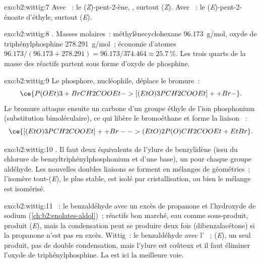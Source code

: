 \begin{solution}{exo:b2:wittig:7}
Avec ~: le (\textit{Z})-pent-2-ène, , surtout (\textit{Z}). Avec
~: le (\textit{E})-pent-2-énoate d'éthyle, surtout (\textit{E}).
\end{solution}

\begin{solution}{exo:b2:wittig:8}
. Masses molaires~: méthylènecyclohexane \qty{96.173}{g/mol},
oxyde de triphénylphosphine \qty{278.291}{g/mol}~; économie d'atomes $96.173/(96.173 + 278.291) =
96.173/374.464 \approx 25.7~\%$. Les trois quarts de la masse des réactifs partent sous forme d'oxyde de phosphine.
\end{solution}

\begin{solution}{exo:b2:wittig:9}
Le phosphore, nucléophile, déplace le bromure~:
\begin{equation*}
\ce{P(OEt)3 + BrCH2COOEt -> [(EtO)3PCH2COOEt]+ + Br-}.
\end{equation*}
Le bromure
attaque ensuite un carbone d'un groupe éthyle de l'ion phosphonium (substitution bimoléculaire), ce qui
libère le bromoéthane et forme la liaison ~:
\begin{equation*}
\ce{[(EtO)3PCH2COOEt]+ + Br- -> (EtO)2P(O)CH2COOEt + EtBr}.
\end{equation*}
\end{solution}

\begin{solution}{exo:b2:wittig:10}
. Il faut deux équivalents de
l'ylure de benzylidène (issu du chlorure de benzyltriphénylphosphonium et d'une base), un pour chaque
groupe aldéhyde. Les nouvelles doubles liaisons se forment en mélanges de géométries~; l'isomère
tout-(\textit{E}), le plus stable, est isolé par cristallisation, ou bien le mélange est isomérisé.
\end{solution}

\begin{solution}{exo:b2:wittig:11}
~: le benzaldéhyde avec un excès de propanone et l'hydroxyde de sodium (\cref{ch:b2:enolates-aldol})~;
réactifs bon marché, eau comme sous-produit, produit (\textit{E}), mais la condensation peut se produire
deux fois (dibenzalacétone) si la propanone n'est pas en excès. Wittig~: le benzaldéhyde avec l' ~; (\textit{E}), un seul produit, pas de double condensation, mais l'ylure
est coûteux et il faut éliminer l'oxyde de triphénylphosphine. La  est ici la meilleure voie.
\end{solution}

